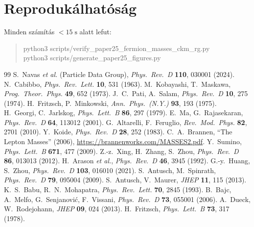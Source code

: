 \documentclass[11pt,a4paper]{article}
\begin{document}
\section*{Reprodukálhatóság}
Minden számítás $< 15\;\mathrm{s}$ alatt lefut:
\begin{quote}\small\ttfamily
python3 scripts/verify\_paper25\_fermion\_masses\_ckm\_rg.py\\
python3 scripts/generate\_paper25\_figures.py
\end{quote}

\begin{thebibliography}{99}\small
{} S.~Navas \textit{et al.} (Particle Data Group), \emph{Phys.\ Rev.\ D} \textbf{110}, 030001 (2024).
 N.~Cabibbo, \emph{Phys.\ Rev.\ Lett.} \textbf{10}, 531 (1963).
 M.~Kobayashi, T.~Maskawa, \emph{Prog.\ Theor.\ Phys.} \textbf{49}, 652 (1973).
 J.~C.~Pati, A.~Salam, \emph{Phys.\ Rev.\ D} \textbf{10}, 275 (1974).
 H.~Fritzsch, P.~Minkowski, \emph{Ann.\ Phys.\ (N.Y.)} \textbf{93}, 193 (1975).
 H.~Georgi, C.~Jarlskog, \emph{Phys.\ Lett.\ B} \textbf{86}, 297 (1979).
 E.~Ma, G.~Rajasekaran, \emph{Phys.\ Rev.\ D} \textbf{64}, 113012 (2001).
 G.~Altarelli, F.~Feruglio, \emph{Rev.\ Mod.\ Phys.} \textbf{82}, 2701 (2010).
 Y.~Koide, \emph{Phys.\ Rev.\ D} \textbf{28}, 252 (1983).
 C.~A.~Brannen, ``The Lepton Masses'' (2006), \url{https://brannenworks.com/MASSES2.pdf}.
 Y.~Sumino, \emph{Phys.\ Lett.\ B} \textbf{671}, 477 (2009).
 Z.-z.~Xing, H.~Zhang, S.~Zhou, \emph{Phys.\ Rev.\ D} \textbf{86}, 013013 (2012).
 H.~Arason \textit{et al.}, \emph{Phys.\ Rev.\ D} \textbf{46}, 3945 (1992).
 G.-y.~Huang, S.~Zhou, \emph{Phys.\ Rev.\ D} \textbf{103}, 016010 (2021).
 S.~Antusch, M.~Spinrath, \emph{Phys.\ Rev.\ D} \textbf{79}, 095004 (2009).
 S.~Antusch, V.~Maurer, \emph{JHEP} \textbf{11}, 115 (2013).
 K.~S.~Babu, R.~N.~Mohapatra, \emph{Phys.\ Rev.\ Lett.} \textbf{70}, 2845 (1993).
 B.~Bajc, A.~Melfo, G.~Senjanović, F.~Vissani, \emph{Phys.\ Rev.\ D} \textbf{73}, 055001 (2006).
 A.~Dueck, W.~Rodejohann, \emph{JHEP} \textbf{09}, 024 (2013).
 H.~Fritzsch, \emph{Phys.\ Lett.\ B} \textbf{73}, 317 (1978).

\end{thebibliography}
\end{document}
